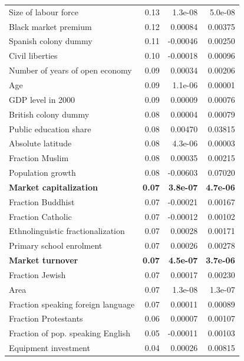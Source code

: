\begin{refsection}
\begin{table}[!htbp]
\begin{tabular}{lrrr}
		  Size of labour force & 0.13 & 1.3e-08 & 5.0e-08 \\ 
		  Black market premium & 0.12 & 0.00084 & 0.00375 \\ 
		  Spanish colony dummy & 0.11 & -0.00046 & 0.00250 \\ 
		  Civil liberties & 0.10 & -0.00018 & 0.00096 \\ 
		  Number of years of open economy & 0.09 & 0.00034 & 0.00206 \\ 
		  Age & 0.09 & 1.1e-06 & 0.00001 \\ 
		  GDP level in 2000 & 0.09 & 0.00009 & 0.00076 \\ 
		  British colony dummy & 0.08 & 0.00004 & 0.00079 \\ 
		  Public education share & 0.08 & 0.00470 & 0.03815 \\ 
		  Absolute latitude & 0.08 & 4.3e-06 & 0.00003 \\ 
		  Fraction Muslim & 0.08 & 0.00035 & 0.00215 \\ 
		  Population growth & 0.08 & -0.00603 & 0.07020 \\ 
		  \textbf{Market capitalization} & \textbf{0.07} & \textbf{3.8e-07} & \textbf{4.7e-06} \\ 
		  Fraction Buddhist & 0.07 & -0.00021 & 0.00167 \\ 
		  Fraction Catholic & 0.07 & -0.00012 & 0.00102 \\ 
		  Ethnolinguistic fractionalization & 0.07 & 0.00028 & 0.00171 \\ 
		  Primary school enrolment & 0.07 & 0.00026 & 0.00278 \\ 
		  \textbf{Market turnover} & \textbf{0.07} & \textbf{4.5e-07} & \textbf{3.7e-06} \\ 
		  Fraction Jewish & 0.07 & 0.00017 & 0.00230 \\ 
		  Area & 0.07 & 1.3e-08 & 1.3e-07 \\ 
		  Fraction speaking foreign language & 0.07 & 0.00011 & 0.00089 \\ 
		  Fraction Protestants & 0.06 & 0.00007 & 0.00107 \\ 
		  Fraction of pop. speaking English & 0.05 & -0.00011 & 0.00103 \\ 
		  Equipment investment & 0.04 & 0.00026 & 0.00815 \\ 
		\bottomrule
	\end{tabular}
\end{table}


\end{refsection}
